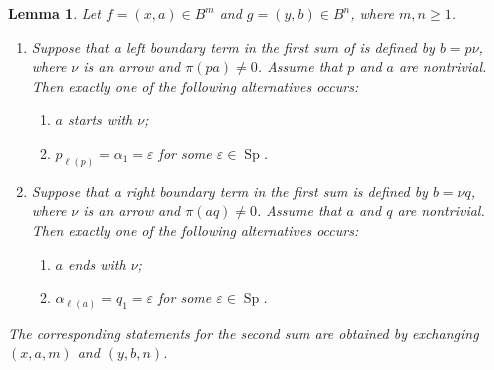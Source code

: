 \documentclass[11pt,a4paper,reqno]{amsart}
\newcommand{\Sp}{\operatorname{Sp}}
\newcommand{\para}[2]{(#1,#2)}
\newcommand{\ep}{\varepsilon}
\theoremstyle{plain}
\newtheorem{lemma}[lemma]{Lemma}
\theoremstyle{definition}
\numberwithin{equation}{section}
\begin{document}
	\begin{lemma}
		\label{lem:higher-boundary-dichotomy}
		Let $f=\para{x}{a}\in B^m$ and $g=\para{y}{b}\in B^n$, where $m,n\geq1$.
		\begin{enumerate}
			\item Suppose that a left boundary term in the first sum of
			 is defined by
			$b=p\nu$,
			where $\nu$ is an arrow and $\pi(pa)\neq0$.
			Assume that $p$ and $a$ are nontrivial. Then exactly one of the
			following alternatives occurs:
			\begin{enumerate}
				\item $a$ starts with $\nu$;
				\item $p_{\ell(p)}=\alpha_1=\ep$ for some $\ep\in\Sp$.
			\end{enumerate}
			
			\item Suppose that a right boundary term in the first sum is defined by
			$b=\nu q$,
			where $\nu$ is an arrow and $\pi(aq)\neq0$.
			Assume that $a$ and $q$ are nontrivial. Then exactly one of the
			following alternatives occurs:
			\begin{enumerate}
				\item $a$ ends with $\nu$;
				\item $\alpha_{\ell(a)}=q_1=\ep$ for some $\ep\in\Sp$.
			\end{enumerate}
		\end{enumerate}
		
		The corresponding statements for the second sum are obtained by exchanging
		$(x,a,m)$ and $(y,b,n)$.
	\end{lemma}
	
\end{document}
